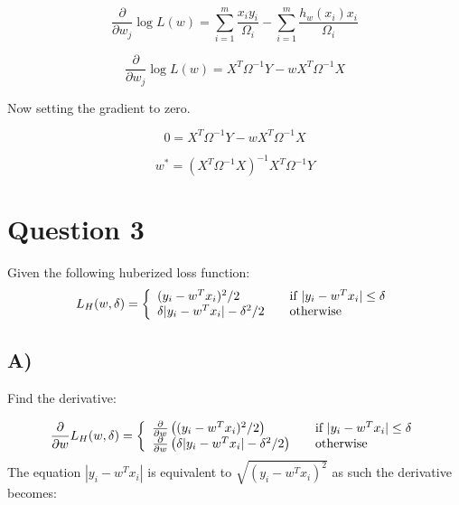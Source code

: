 \documentclass{report}
\begin{document}
\begin{equation}
     \frac{\partial}{\partial w_j} \log L(w) =
     \sum_{i=1}^{m} \frac{x_iy_i}{\Omega_i}
     - \sum_{i=1}^{m}\frac{h_w(x_i)x_i}{\Omega_i}
\end{equation}

\begin{equation}
     \frac{\partial}{\partial w_j} \log L(w) =
     X^T\Omega^{-1}Y - wX^T\Omega^{-1}X
\end{equation}

Now setting the gradient to zero.

\begin{equation}
     0 =X^T\Omega^{-1}Y
     - wX^T\Omega^{-1}X
\end{equation}

\begin{equation}
     w^* = (X^T\Omega^{-1} X)^{-1} X^T\Omega^{-1} Y
\end{equation}


\section*{Question 3}
Given the following huberized loss function:
\begin{equation}
  L_H(w, \delta) = \left\{
  \begin{array}{l l}
    (y_i - w^Tx_i)^2 / 2 & \quad \text{if }  | y_i - w^Tx_i | \leq \delta\\
    \delta | y_i - w^Tx_i | - \delta^2 / 2 & \quad \text{otherwise}

  \end{array} \right.\end{equation}


\subsection*{A)}
Find the derivative:

\begin{equation}
  \frac{\partial}{\partial w} L_H(w, \delta) = \left\{
  \begin{array}{l l}
    \frac{\partial}{\partial w} \left((y_i - w^Tx_i)^2 / 2 \right)& \quad \text{if }  | y_i - w^Tx_i | \leq \delta\\
    \frac{\partial}{\partial w} \left(\delta | y_i - w^Tx_i | - \delta^2 / 2\right) & \quad \text{otherwise}

  \end{array} \right.\end{equation}
The equation $| y_i - w^Tx_i |$ is equivalent to $\sqrt{( y_i - w^Tx_i )^2}$ as such
the derivative becomes:
\end{document}
